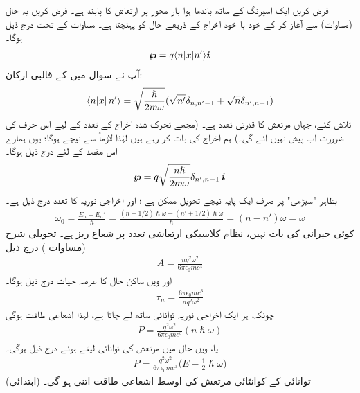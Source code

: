 فرض کریں ایک  اسپرنگ کے ساتھ باندھا ہوا بار  محور  پر ارتعاش کا پابند ہے۔ فرض  کریں یہ حال  (مساوات)  سے آغاز کر کے خود با خود اخراج   کے ذریعے  حال  کو  پہنچتا ہے۔ مساوات کے تحت درج ذیل ہوگا۔
\begin{align*}
	{\ensuremath{{\boldsymbol{\wp}}}} = q\langle n|x|n'\rangle{\boldsymbol{i}}
\end{align*}
آپ نے سوال  میں  کے قالبی ارکان:
\begin{align*}
	\langle n\abs{x}n'\rangle = \sqrt{\frac{\hslash}{2m\omega}}(\sqrt{n'}\delta_{n,n'-1}+\sqrt{n}\delta_{n',n-1})
\end{align*}
 تلاش کئے، جہاں مرتعش کا  قدرتی تعدد  ہے۔ (مجھے تحرک شدہ اخراج کے تعدد کے لیے اس حرف کی ضرورت اب پیش نہیں آئے گی۔)   ہم اخراج کی بات کر رہے ہیں لہٰذا  لازماً   سے نیچے  ہوگا؛ یوں  ہمارے اس مقصد کے لئے درج ذیل ہوگا۔
\begin{align}
	{\ensuremath{{\boldsymbol{\wp}}}} = q\sqrt{\frac{n\hslash}{2m\omega}}\delta_{n', n-1}\,{\boldsymbol{i}}
\end{align}
بظاہر  "سیڑھی"  پر صرف ایک پایہ   نیچے تحویل  ممکن ہے ؛  اور اخراجی نوریہ کا تعدد درج ذیل ہے۔
\begin{align}
	\omega_0 = \frac{E_n-E_n'}{\hslash} = \frac{(n+1/2)\hslash\omega - (n'+ 1/2)\hslash\omega}{\hslash} =(n-n')\omega = \omega
\end{align}
کوئی حیرانی  کی بات نہیں،  نظام کلاسیکی ارتعاشی تعدد پر  شعاع ریز   ہے۔ تحویلی شرح  (مساوات )  درج ذیل
\begin{align}
	A = \frac{nq^2\omega^2}{6\pi\epsilon_0mc^3}
\end{align}
اور ویں ساکن حال کا عرصہ حیات درج ذیل ہوگا۔
\begin{align}
	\tau_n = \frac{6\pi\epsilon_0mc^3}{nq^2\omega^2}
\end{align}
چونکہ،  ہر ایک اخراجی نوریہ  توانائی ساتھ لے جاتا ہے،  لہٰذا  اشعاعی  طاقت  ہوگی
\begin{align*}
	P = \frac{q^2\omega^2}{6\pi\epsilon_0mc^3}(n\hslash\omega)
\end{align*}
یا،  ویں حال میں مرتعش کی توانائی  لیتے ہوئے درج ذیل ہوگی۔
\begin{align}\label{مساوات_تابع_مضطرب_زمینی_توانائی_رہے_گی}
	P = \frac{q^2\omega^2}{6\pi\epsilon_0mc^3}\big(E-\frac{1}{2}\hslash\omega\big)
\end{align}
(ابتدائی)  توانائی  کے کوانٹائی مرتعش کی  اوسط اشعاعی     طاقت اتنی  ہو گی۔

